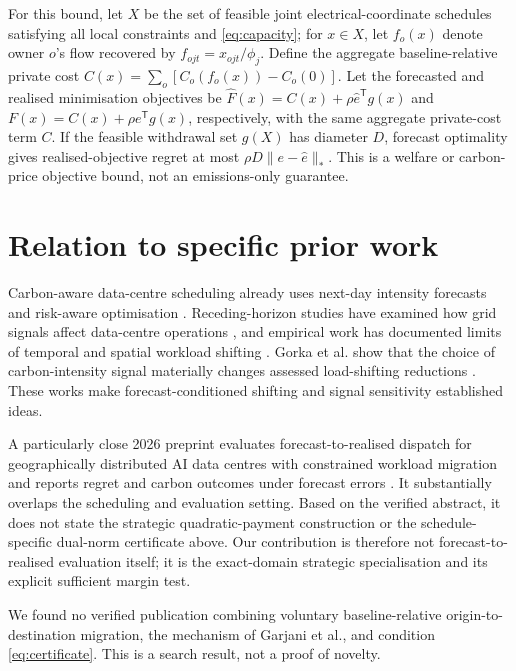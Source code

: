 \documentclass{article}
\begin{document}
For this bound, let $X$ be the set of feasible joint electrical-coordinate schedules satisfying all local constraints and \eqref{eq:capacity}; for $x\in X$, let $f_o(x)$ denote owner $o$'s flow recovered by $f_{ojt}=x_{ojt}/\phi_j$. Define the aggregate baseline-relative private cost
$C(x)=\sum_o[C_o(f_o(x))-C_o(0)]$. Let the forecasted and realised minimisation objectives be
$\widehat F(x)=C(x)+\rho\widehat e^{\mathsf T}g(x)$ and
$F(x)=C(x)+\rho e^{\mathsf T}g(x)$, respectively, with the same aggregate private-cost term $C$. If the feasible withdrawal set $g(X)$ has diameter $D$, forecast optimality gives realised-objective regret at most
$\rho D\lVert e-\widehat e\rVert_*$. This is a welfare or carbon-price objective bound, not an emissions-only guarantee.

\section{Relation to specific prior work}

Carbon-aware data-centre scheduling already uses next-day intensity forecasts and risk-aware optimisation \cite{radovanovic2022}. Receding-horizon studies have examined how grid signals affect data-centre operations \cite{zhang2022}, and empirical work has documented limits of temporal and spatial workload shifting \cite{sukprasert2023}. Gorka et al. show that the choice of carbon-intensity signal materially changes assessed load-shifting reductions \cite{gorka2025}. These works make forecast-conditioned shifting and signal sensitivity established ideas.

A particularly close 2026 preprint evaluates forecast-to-realised dispatch for geographically distributed AI data centres with constrained workload migration and reports regret and carbon outcomes under forecast errors \cite{cai2026ssrn}. It substantially overlaps the scheduling and evaluation setting. Based on the verified abstract, it does not state the strategic quadratic-payment construction or the schedule-specific dual-norm certificate above. Our contribution is therefore not forecast-to-realised evaluation itself; it is the exact-domain strategic specialisation and its explicit sufficient margin test.

We found no verified publication combining voluntary baseline-relative origin-to-destination migration, the mechanism of Garjani et al., and condition \eqref{eq:certificate}. This is a search result, not a proof of novelty.
\end{document}
